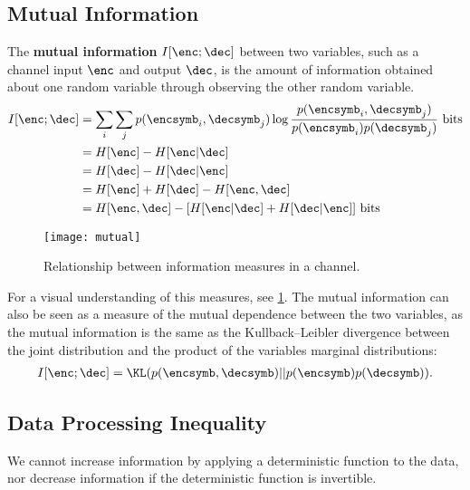 \subsection{Mutual Information}
\begin{definition}\label{def_mutual_information}
	The \textbf{mutual information} \(I[\enc;\dec]\) between two variables, such as a channel input \(\enc\) and output \(\dec\), is the amount of information obtained about one random variable through observing the other random variable.
	\begin{align}
		I[\enc;\dec] &= \sum_i \sum_j p(\encsymb_i, \decsymb_j) \log \frac{p(\encsymb_i, \decsymb_j)}{p(\encsymb_i) p(\decsymb_j)} \text{ bits} \label{eq:mutual_information}\\
		&= H[\enc] - H[\enc|\dec]\\
		&= H[\dec] - H[\dec|\enc]\\
		&= H[\enc] + H[\dec] - H[\enc, \dec]\\
		&= H[\enc, \dec] - [H[\enc|\dec] + H[\dec|\enc]] \text{ bits}
	\end{align}
\end{definition}
\begin{figure}
	[hbt!] \centering
	\texttt{[image: mutual]}
	\caption{Relationship between information measures in a channel.}\label{fig:mutual}
\end{figure}
For a visual understanding of this measures, see \cref{fig:mutual}.
The mutual information can also be seen as a measure of the mutual dependence between the two variables, as the mutual information is the same as the Kullback–Leibler divergence between the joint distribution and the product of the variables marginal distributions:
\begin{align}
	I[\enc;\dec] = \KL(p(\encsymb, \decsymb)||p(\encsymb)p(\decsymb)) .
\end{align}

\subsection{Data Processing Inequality}
We cannot increase information by applying a deterministic function to the data, nor decrease information if the deterministic function is invertible.

